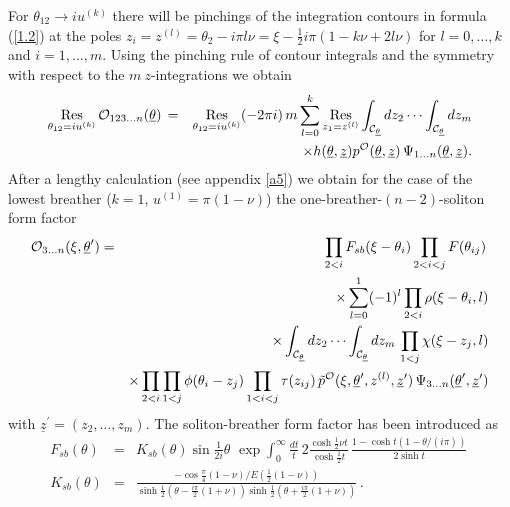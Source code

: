 \documentclass[a4paper,a4paper]{article}
\begin{document}
For $\theta _{12}\rightarrow iu^{(k)}$ there will be pinchings of the
integration contours in formula (\ref{1.2}) at the poles $%
z_{i}=z^{(l)}=\theta _{2}-i\pi l\nu =\xi -\frac{1}{2}i\pi (1-k\nu +2l\nu )$
for $l=0,\dots ,k$ and $i=1,\dots ,m$. Using the pinching rule of contour
integrals and the symmetry with respect to the $m~z$-integrations we obtain 
\begin{eqnarray*}
\mathop{\rm Res}_{\theta _{12}=iu^{(k)}}\mathcal{O}_{123\dots n}(\underline{%
\theta })\, &=&\mathop{\rm Res}_{\theta _{12}=iu^{(k)}}(-2\pi
i)\,m\sum_{l=0}^{k}\mathop{\rm Res}_{z_{1}=z^{(l)}}\int_{\mathcal{C}_{%
\underline{\theta }}}dz_{2}\cdots \int_{\mathcal{C}_{\underline{\theta }%
}}dz_{m} \\
&&\times h(\underline{\theta }{,\underline{z}})p^{\mathcal{O}}(\underline{%
\theta }{,\underline{z}})\,\Psi _{1\dots n}(\underline{\theta },{\underline{z%
}}).
\end{eqnarray*}
After a lengthy calculation (see appendix \ref{a5}) we obtain for the case
of the lowest breather ($k=1,\,u^{(1)}=\pi (1-\nu )$) the one-breather-$%
(n-2) $-soliton form factor 
\begin{eqnarray*}
\mathcal{O}_{3\dots n}(\xi ,\underline{\theta }^{\prime })
&=&\prod_{2<i}F_{sb}(\xi -\theta _{i})\prod_{2<i<j}F(\theta _{ij})\, \\
&&\times \sum_{l=0}^{1}(-1)^{l}\prod_{2<i}\rho (\xi -\theta _{i},l) \\
&&\times \int_{\mathcal{C}_{\underline{\theta }}}dz_{2}\cdots \int_{\mathcal{%
C}_{\underline{\theta }}}dz_{m}\,\prod_{1<j}\chi (\xi -z_{j},l) \\
&&\times \prod_{2<i}\prod_{1<j}\phi (\theta _{i}-z_{j})\prod_{1<i<j}\tau
(z_{ij})\,\tilde{p}^{\mathcal{O}}(\xi ,\underline{\theta }^{\prime },z^{(l)},%
{\underline{z}}^{\prime })\,\Psi _{3\dots n}(\underline{\theta }^{\prime },{%
\underline{z}}^{\prime })
\end{eqnarray*}
with ${\underline{z}}^{\prime }=\left( z_{2},\dots ,z_{m}\right) $. The
soliton-breather form factor has been introduced as 
\begin{eqnarray*}
F_{sb}(\theta ) &=&K_{sb}(\theta )\sin \tfrac{1}{2i}\theta \,\,\exp
\int_{0}^{\infty }\frac{dt}{t}\,2\frac{\cosh \frac{1}{2}\nu t}{\cosh \frac{1%
}{2}t}\,\frac{1-\cosh t(1-\theta /(i\pi ))}{2\sinh t}\, \\
K_{sb}(\theta ) &=&\frac{-\cos \tfrac{\pi }{4}(1-\nu )/E(\frac{1}{2}(1-\nu ))%
}{\sinh \frac{1}{2}(\theta -\frac{i\pi }{2}(1+\nu ))\sinh \frac{1}{2}(\theta
+\frac{i\pi }{2}(1+\nu ))}\,.
\end{eqnarray*}
\end{document}
